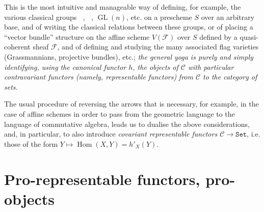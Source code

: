 \documentclass{article}
\newcommand{\scr}[1]{{\mathscr{#1}}}
\renewcommand{\cal}[1]{{\mathcal{#1}}}
\newcommand{\Set}{\mathtt{Set}}
\DeclareMathOperator{\Hom}{Hom}
\DeclareMathOperator{\GL}{GL}
\DeclareMathOperator{\Ga}{G_a}
\DeclareMathOperator{\Gm}{G_m}
\newcommand{\oldpage}[1]{\marginpar{\footnotesize$\Big\vert$ \textit{p.~#1}}}
\begin{document}
This is the most intuitive and manageable way of defining, for example, the various classical groups $\Ga$, $\Gm$, $\GL(n)$, etc. on a prescheme $S$ over an arbitrary base, and of writing the classical relations between these groups, or of placing a ``vector bundle'' structure on the affine scheme $V(\scr{F})$ over $S$ defined by a quasi-coherent sheaf $\scr{F}$, and of defining and studying the many associated flag varieties (Grassmannians, projective bundles), etc.;
\emph{the general yoga is purely and simply identifying, using the canonical functor $h$, the objects of $\cal{C}$ with particular contravariant functors (namely, representable functors)}
\oldpage{195-03}
\emph{from $\cal{C}$ to the category of sets.}

The usual procedure of reversing the arrows that is necessary, for example, in the case of affine schemes in order to pass from the geometric language to the language of commutative algebra, leads us to dualise the above considerations, and, in particular, to also introduce \emph{covariant representable functors $\cal{C}\to\Set$}, i.e. those of the form $Y\mapsto\Hom(X,Y)=h'_X(Y)$.


\section{Pro-representable functors, pro-objects}
\label{A.2}
\end{document}

